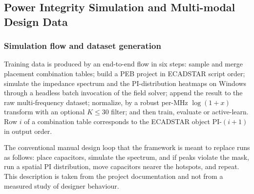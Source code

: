 

\subsection{Power Integrity Simulation and Multi-modal Design Data}
\label{subsec:pi_simulation_multimodal}

\subsubsection*{Simulation flow and dataset generation}

Training data is produced by an end-to-end flow in six steps: sample and merge
placement combination tables; build a PEB project in ECADSTAR script order;
simulate the impedance spectrum and the PI-distribution heatmaps on Windows
through a headless batch invocation of the field solver; append the result to the
raw multi-frequency dataset; normalize, by a robust per-MHz $\log(1+x)$ transform
with an optional $K \le 30$ filter; and then train, evaluate or active-learn.
Row $i$ of a combination table corresponds to the ECADSTAR object
PI-$(i{+}1)$ in output order.

The conventional manual design loop that the framework is meant to replace runs
as follows: place capacitors, simulate the spectrum, and if peaks violate the
mask, run a spatial PI distribution, move capacitors nearer the hotspots, and
repeat. This description is taken from the project documentation and not from a
measured study of designer behaviour.



